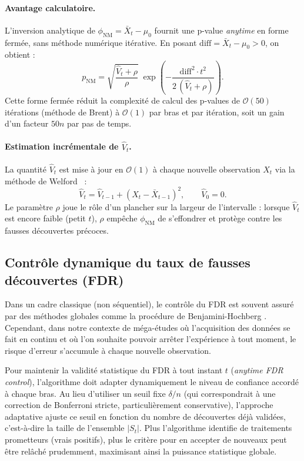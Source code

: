 \documentclass[11pt,a4paper]{article}
\newcommand{\calO}{\mathcal{O}}
\newcommand{\phinm}{\phi_{\mathrm{NM}}}
\begin{document}
\paragraph{Avantage calculatoire.}
L'inversion analytique de $\phinm = \bar{X}_t - \mu_0$ fournit une
p-value \emph{anytime} en forme fermée, sans méthode numérique itérative.
En posant $\mathrm{diff} = \bar{X}_t - \mu_0 > 0$, on obtient :
\[
  p_{\mathrm{NM}}
  = \sqrt{\frac{\hat{V}_t + \rho}{\rho}}\;
    \exp\!\left(-\frac{\mathrm{diff}^2\cdot t^2}{2\,(\hat{V}_t+\rho)}\right).
\]
Cette forme fermée réduit la complexité de calcul des p-values de
$\calO(50)$ itérations (méthode de Brent) à $\calO(1)$ par bras
et par itération, soit un gain d'un facteur $50n$ par pas de temps.

\paragraph{Estimation incrémentale de $\hat{V}_t$.}
La quantité $\hat{V}_t$ est mise à jour en $\calO(1)$ à chaque
nouvelle observation $X_t$ via la méthode de Welford~\cite{welford1962} :
\[
  \hat{V}_t = \hat{V}_{t-1} + (X_t - \bar{X}_{t-1})^2,
  \qquad \hat{V}_0 = 0.
\]
Le paramètre $\rho$ joue le rôle d'un plancher sur la largeur de
l'intervalle : lorsque $\hat{V}_t$ est encore faible (petit $t$),
$\rho$ empêche $\phinm$ de s'effondrer et protège contre les
fausses découvertes précoces.

\subsection{Contrôle dynamique du taux de fausses découvertes (FDR)}

Dans un cadre classique (non séquentiel), le contrôle du FDR est souvent assuré par des méthodes globales comme la procédure de Benjamini-Hochberg \cite{benjamini1995}. Cependant, dans notre contexte de méga-études où l'acquisition des données se fait en continu et où l'on souhaite pouvoir arrêter l'expérience à tout moment, le risque d'erreur s'accumule à chaque nouvelle observation.

Pour maintenir la validité statistique du FDR à tout instant $t$ (\textit{anytime FDR control}), l'algorithme doit adapter dynamiquement le niveau de confiance accordé à chaque bras. Au lieu d'utiliser un seuil fixe $\delta/n$ (qui correspondrait à une correction de Bonferroni stricte, particulièrement conservative), l'approche adaptative ajuste ce seuil en fonction du nombre de découvertes déjà validées, c'est-à-dire la taille de l'ensemble $|S_t|$. Plus l'algorithme identifie de traitements prometteurs (vrais positifs), plus le critère pour en accepter de nouveaux peut être relâché prudemment, maximisant ainsi la puissance statistique globale.
\end{document}
